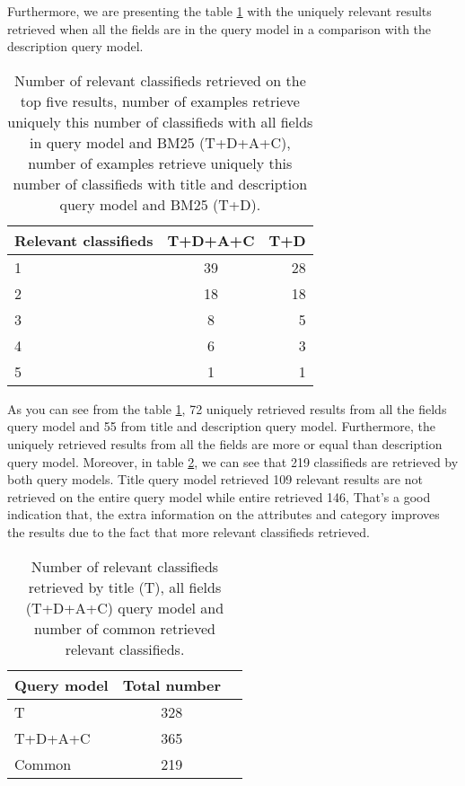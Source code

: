 Furthermore, we are presenting the table \ref{table:tVsEntRank} with the uniquely relevant results retrieved when all the fields are in the query model in a comparison with the description query model.

\begin{table}[H]
\begin{center}
\caption{Number of relevant classifieds retrieved on the top five results, number of examples retrieve uniquely this number of classifieds with all fields in query model and BM25 (T+D+A+C), number of examples retrieve uniquely this number of classifieds with title and description query model and BM25 (T+D).}
\label{table:tVsEntRank}
\begin{tabular}{lcr}
\midrule
Relevant classifieds &  T+D+A+C & T+D \\
\midrule
	1 & 39 & 28 \\
	2 & 18 & 18 \\
	3 & 8 & 5 \\
	4 & 6 & 3 \\
	5 & 1 & 1 \\
\bottomrule
\end{tabular}
\end{center}
\end{table}

As you can see from the table \ref{table:tVsEntRank}, 72 uniquely retrieved results from all the fields query model and 55 from title and description query model. Furthermore, the uniquely retrieved results from all the fields are more or equal than description query model. Moreover, in table \ref{table:tVsEnt}, we can see that 219 classifieds are retrieved by both query models. Title query model retrieved 109 relevant results are not retrieved on the entire query model while entire retrieved 146, That's a good indication that, the extra information on the attributes and category improves the results due to the fact that more relevant classifieds retrieved.

\begin{table}[H]
\begin{center}
\caption{Number of relevant classifieds retrieved by title (T), all fields (T+D+A+C) query model and number of common retrieved relevant classifieds.}
\label{table:tVsEnt}
\begin{tabular}{lcr}
\midrule
 Query model &  Total number \\
\midrule
	T & 328 \\
	T+D+A+C & 365 \\
	Common & 219 \\
\bottomrule
\end{tabular}
\end{center}
\end{table}

